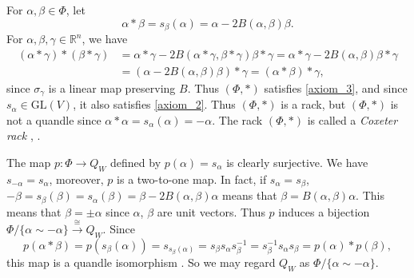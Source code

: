 \documentclass{amsart}
\theoremstyle{definition}
\theoremstyle{remark}
\numberwithin{equation}{section}
\begin{document}
For $\alpha, \beta \in \Phi$, let
\begin{equation}
\label{eq:star_operation}
\alpha * \beta = s_{\beta} (\alpha) = 
\alpha - 2 B(\alpha, \beta) \beta.
\end{equation}
For $\alpha, \beta, \gamma \in \mathbb{R}^n$, we have
\begin{equation}
\label{eq:distributive}
\begin{split}
(\alpha * \gamma) * (\beta * \gamma)
&= \alpha * \gamma 
- 2 B (\alpha*\gamma, \beta*\gamma)\beta * \gamma
= \alpha * \gamma - 2 B (\alpha, \beta) \beta * \gamma  \\
&= (\alpha - 2 B(\alpha, \beta) \beta ) * \gamma
= (\alpha * \beta ) * \gamma, 
\end{split}
\end{equation}
since $\sigma_{\gamma}$ is a linear map preserving $B$.
Thus $(\Phi, *)$ satisfies \ref{axiom_3}, and since $s_\alpha \in \mathrm{GL}(V)$, 
it also satisfies \ref{axiom_2}. 
Thus $(\Phi, *)$ is a rack, but $(\Phi, *)$ is not a quandle 
since $\alpha * \alpha = s_{\alpha}(\alpha) = - \alpha$.
The rack $(\Phi, *)$ is called a \emph{Coxeter rack} \cite{AG}, \cite{Akita}.

The map $p : \Phi \to Q_W$ defined by $p(\alpha) = s_{\alpha}$ is clearly surjective. 
We have $s_{-\alpha} = s_{\alpha}$, moreover, $p$ is a two-to-one map. 
In fact, if $s_{\alpha} = s_{\beta}$,
$-\beta = s_{\beta} (\beta) = s_{\alpha} (\beta) = \beta - 2 B(\alpha, \beta) \alpha$
means that $\beta = B(\alpha, \beta) \alpha$.
This means that $\beta = \pm \alpha$ since $\alpha$, $\beta$ are unit vectors.
Thus $p$ induces a bijection $\Phi/\{ \alpha \sim -\alpha \} \xrightarrow{\cong} Q_W$.
Since
\[
p(\alpha * \beta) = p(s_{\beta} (\alpha)) = s_{s_{\beta} (\alpha)} 
= s_{\beta} s_\alpha s_{\beta}^{-1} = s_{\beta}^{-1} s_\alpha s_{\beta} = p(\alpha) * p(\beta), 
\]
this map is a quandle isomorphism \cite{Akita}.
So we may regard $Q_W$ as $\Phi/\{ \alpha \sim -\alpha \}$.
\end{document}
